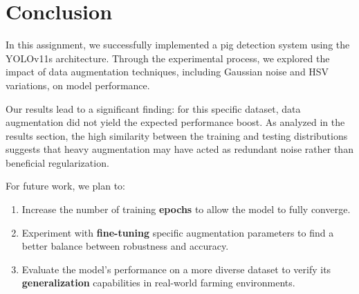 \documentclass{article}
\begin{document}
\clearpage
\section{Conclusion}

In this assignment, we successfully implemented a pig detection system 
using the YOLOv11s architecture. Through the experimental process, 
we explored the impact of data augmentation techniques, including 
Gaussian noise and HSV variations, on model performance.

Our results lead to a significant finding: for this specific dataset, 
data augmentation did not yield the expected performance boost. As 
analyzed in the results section, the high similarity between the training 
and testing distributions suggests that heavy augmentation may have acted 
as redundant noise rather than beneficial regularization. 

For future work, we plan to:
\begin{enumerate}
    \item Increase the number of training \textbf{epochs} to allow the model to fully converge.
    \item Experiment with \textbf{fine-tuning} specific augmentation parameters to find a better balance between robustness and accuracy.
    \item Evaluate the model's performance on a more diverse dataset to verify its \textbf{generalization} capabilities in real-world farming environments.
\end{enumerate}
\end{document}
